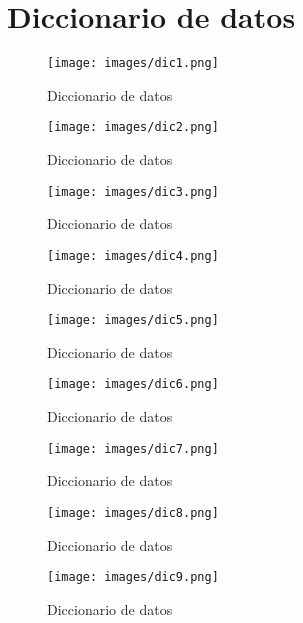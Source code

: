 \section{Diccionario de datos}
\begin{figure}[htbp]
	\centering
		\texttt{[image: images/dic1.png]}
	\caption{Diccionario de datos}
	\label{fig:dicdatos1}
\end{figure}%
\begin{figure}[htbp]
	\centering
		\texttt{[image: images/dic2.png]}
	\caption{Diccionario de datos}
	\label{fig:dicdatos2}
\end{figure}%
\begin{figure}[htbp]
	\centering
		\texttt{[image: images/dic3.png]}
	\caption{Diccionario de datos}
	\label{fig:dicdatos3}
\end{figure}%
\begin{figure}[htbp]
	\centering
		\texttt{[image: images/dic4.png]}
	\caption{Diccionario de datos}
	\label{fig:dicdatos4}
\end{figure}%
\begin{figure}[htbp]
	\centering
		\texttt{[image: images/dic5.png]}
	\caption{Diccionario de datos}
	\label{fig:dicdatos5}
\end{figure}%
\begin{figure}[htbp]
	\centering
		\texttt{[image: images/dic6.png]}
	\caption{Diccionario de datos}
	\label{fig:dicdatos6}
\end{figure}%
\begin{figure}[htbp]
	\centering
		\texttt{[image: images/dic7.png]}
	\caption{Diccionario de datos}
	\label{fig:dicdatos7}
\end{figure}%
\begin{figure}[htbp]
	\centering
		\texttt{[image: images/dic8.png]}
	\caption{Diccionario de datos}
	\label{fig:dicdatos8}
\end{figure}%
\begin{figure}[htbp]
	\centering
		\texttt{[image: images/dic9.png]}
	\caption{Diccionario de datos}
	\label{fig:dicdatos9}
\end{figure}%

